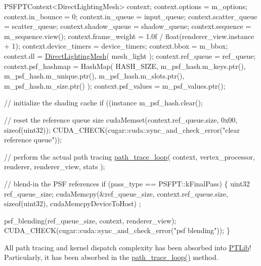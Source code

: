 \begin{DoxyCodeInclude}
            PSFPTContext<DirectLightingMesh> context;
            context.options         = m\_options;
            context.in\_bounce       = 0;
            context.in\_queue        = input\_queue;
            context.scatter\_queue   = scatter\_queue;
            context.shadow\_queue    = shadow\_queue;
            context.sequence        = m\_sequence.view();
            context.frame\_weight    = 1.0f / float(renderer\_view.instance + 1);
            context.device\_timers   = device\_timers;
            context.bbox            = m\_bbox;
            context.dl              = \hyperlink{struct_direct_lighting_mesh}{DirectLightingMesh}( mesh\_light );
            context.ref\_queue       = ref\_queue;
            context.psf\_hashmap     = HashMap(
                HASH\_SIZE,
                m\_psf\_hash.m\_keys.ptr(),
                m\_psf\_hash.m\_unique.ptr(),
                m\_psf\_hash.m\_slots.ptr(),
                m\_psf\_hash.m\_size.ptr()
            );
            context.psf\_values = m\_psf\_values.ptr();

            \textcolor{comment}{// initialize the shading cache}
            \textcolor{keywordflow}{if} ((instance %
                m\_psf\_hash.clear();

            \textcolor{comment}{// reset the reference queue size}
            cudaMemset(context.ref\_queue.size, 0x00, \textcolor{keyword}{sizeof}(uint32));
            CUDA\_CHECK(cugar::cuda::sync\_and\_check\_error(\textcolor{stringliteral}{"clear reference queue"}));

            \textcolor{comment}{// perform the actual path tracing}
            \hyperlink{group___p_t_lib_gadbd6e824e2ecdd07fae235bddebcd1d8}{path\_trace\_loop}( context, vertex\_processor, renderer, renderer\_view, stats );

            \textcolor{comment}{// blend-in the PSF references}
            \textcolor{keywordflow}{if} (pass\_type == PSFPT::kFinalPass)
            \{
                uint32 ref\_queue\_size;
                cudaMemcpy(&ref\_queue\_size, context.ref\_queue.size, \textcolor{keyword}{sizeof}(uint32), cudaMemcpyDeviceToHost)
      ;

                psf\_blending(ref\_queue\_size, context, renderer\_view);
                CUDA\_CHECK(cugar::cuda::sync\_and\_check\_error(\textcolor{stringliteral}{"psf blending"}));
            \}
\end{DoxyCodeInclude}
 \begin{DoxyParagraph}{}
All path tracing and kernel dispatch complexity has been absorbed into \hyperlink{_p_t_lib_page}{P\+T\+Lib}! Particularly, it has been absorbed in the \hyperlink{_p_t_lib_page_path_trace_loop_anchor}{path\+\_\+trace\+\_\+loop()} method.
\end{DoxyParagraph}
